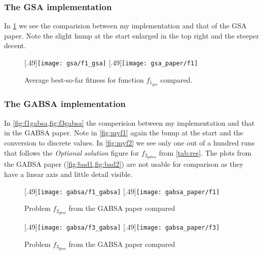  
 
%
\subsubsection*{The GSA implementation}
In \cref{fig:f1} we see the comparision between my implementation and that of the GSA paper. Note the slight hump at the start enlarged in the top right and the steeper decent.
%
\begin{figure}
	\centering
		[.49\linewidth]{\texttt{[image: gsa/f1\_gsa]}}
		[.49\linewidth]{\texttt{[image: gsa\_paper/f1]}}
	\caption{Average best-so-far fitness for function $f_{1_{gsa}}$ compared.}
    \label{fig:f1}
\end{figure}
%
\subsubsection*{The GABSA implementation}
In \cref{fig:f1gabsa,fig:f3gabsa} the comperision between my implementation and that in the GABSA paper. Note in \cref{fig:myf1} again the bump at the start and the conversion to discrete values. In \cref{fig:myf2} we see only one out of a hundred runs that follows the \textit{Optional solution} figure for $f_{2_{gabsa}}$ from \cref{tab:res}. The plots from the GABSA paper (\cref{fig:bad1,fig:bad2}) are not usable for comparison as they have a linear axis and little detail visible.
%
\begin{figure}
	\centering
		[.49\linewidth]{\texttt{[image: gabsa/f1\_gabsa]}}
		[.49\linewidth]{\texttt{[image: gabsa\_paper/f1]}}
	\caption{Problem $f_{2_{gbsa}}$ from the GABSA paper\cite{GBSA} compared}
    \label{fig:f1gabsa}
\end{figure}
%
\begin{figure}
	\centering
		[.49\linewidth]{\texttt{[image: gabsa/f3\_gabsa]}}
		[.49\linewidth]{\texttt{[image: gabsa\_paper/f3]}}
	\caption{Problem $f_{3_{gbsa}}$ from the GABSA paper\cite{GBSA} compared}
    \label{fig:f3gabsa}
\end{figure}
%

